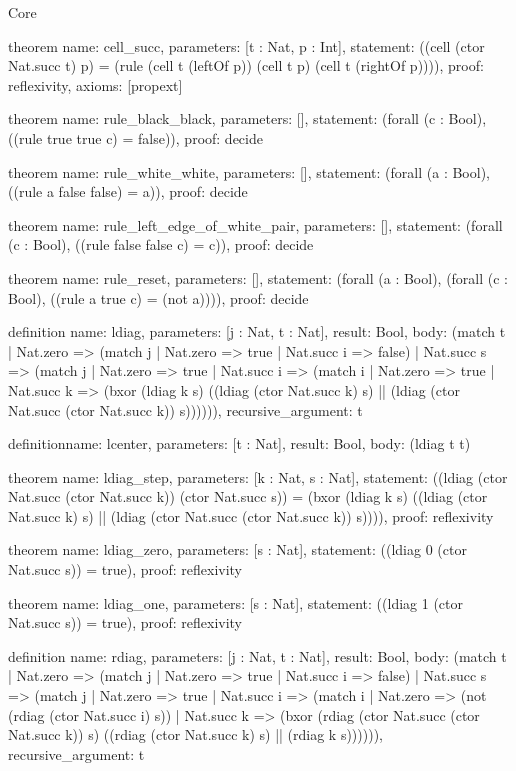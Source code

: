 \begin{lexlean}{Core}
\begin{semanticmodule}
theorem{
  name: cell_succ,
  parameters: [t : Nat, p : Int],
  statement: ((cell (ctor Nat.succ t) p) = (rule (cell t (leftOf p)) (cell t p) (cell t (rightOf p)))),
  proof: reflexivity{},
  axioms: [propext]
}

theorem{
  name: rule_black_black,
  parameters: [],
  statement: (forall (c : Bool), ((rule true true c) = false)),
  proof: decide{}
}

theorem{
  name: rule_white_white,
  parameters: [],
  statement: (forall (a : Bool), ((rule a false false) = a)),
  proof: decide{}
}

theorem{
  name: rule_left_edge_of_white_pair,
  parameters: [],
  statement: (forall (c : Bool), ((rule false false c) = c)),
  proof: decide{}
}

theorem{
  name: rule_reset,
  parameters: [],
  statement: (forall (a : Bool), (forall (c : Bool), ((rule a true c) = (not a)))),
  proof: decide{}
}

definition{
  name: ldiag,
  parameters: [j : Nat, t : Nat],
  result: Bool,
  body: (match t
    | Nat.zero => (match j | Nat.zero => true | Nat.succ i => false)
    | Nat.succ s => (match j
      | Nat.zero => true
      | Nat.succ i => (match i
        | Nat.zero => true
        | Nat.succ k => (bxor (ldiag k s) ((ldiag (ctor Nat.succ k) s) || (ldiag (ctor Nat.succ (ctor Nat.succ k)) s)))))),
  recursive_argument: t
}

definition{name: lcenter, parameters: [t : Nat], result: Bool, body: (ldiag t t)}

theorem{
  name: ldiag_step,
  parameters: [k : Nat, s : Nat],
  statement: ((ldiag (ctor Nat.succ (ctor Nat.succ k)) (ctor Nat.succ s)) = (bxor (ldiag k s) ((ldiag (ctor Nat.succ k) s) || (ldiag (ctor Nat.succ (ctor Nat.succ k)) s)))),
  proof: reflexivity{}
}

theorem{
  name: ldiag_zero,
  parameters: [s : Nat],
  statement: ((ldiag 0 (ctor Nat.succ s)) = true),
  proof: reflexivity{}
}

theorem{
  name: ldiag_one,
  parameters: [s : Nat],
  statement: ((ldiag 1 (ctor Nat.succ s)) = true),
  proof: reflexivity{}
}

definition{
  name: rdiag,
  parameters: [j : Nat, t : Nat],
  result: Bool,
  body: (match t
    | Nat.zero => (match j | Nat.zero => true | Nat.succ i => false)
    | Nat.succ s => (match j
      | Nat.zero => true
      | Nat.succ i => (match i
        | Nat.zero => (not (rdiag (ctor Nat.succ i) s))
        | Nat.succ k => (bxor (rdiag (ctor Nat.succ (ctor Nat.succ k)) s) ((rdiag (ctor Nat.succ k) s) || (rdiag k s)))))),
  recursive_argument: t
}


\end{semanticmodule}
\end{lexlean}
